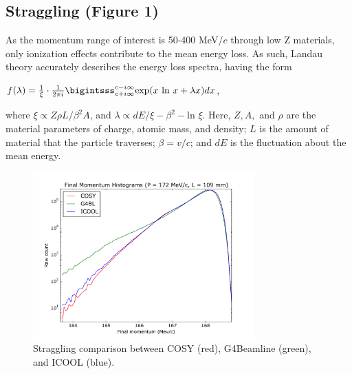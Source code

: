 \documentclass{jacow}
\begin{document}
\subsection{Straggling (Figure 1)}
As the momentum range of interest is 50-400 MeV/$c$ through low Z materials, only ionization effects contribute to the mean energy loss. As such, Landau theory accurately describes the energy loss spectra, having the form \cite{LANDAU} \\ \begin{center} $f(\lambda) = \frac{1}{\xi} \cdot \frac{1}{2\pi i} \bigintsss_{c+i \infty} ^{c-i \infty} \text{exp}(x\text{ ln } x + \lambda x) dx$,  \end{center}  where $\xi \propto Z\rho L/\beta^2 A$, and $\lambda \propto dE/\xi - \beta^2 - \text{ln } \xi$. Here, $Z, A,$ and $\rho$ are the material parameters of charge, atomic mass, and density; $L$ is the amount of material that the particle traverses; $\beta=v/c$; and $dE$ is the fluctuation about the mean energy.


\begin{figure}[h!]
\centering
\includegraphics*[width=85mm]{Figures/figure1.pdf}
\caption{Straggling comparison between COSY (red), G4Beamline (green), and ICOOL (blue).}
\end{figure}
\end{document}
